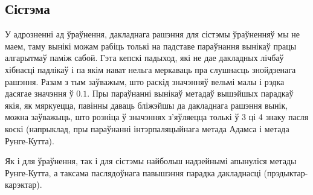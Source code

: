 \subsection*{Сістэма}
У адрозненні ад ўраўнення, дакладнага рашэння для сістэмы ўраўненняў мы не маем, таму вынікі можам рабіць толькі на падставе параўнання вынікаў працы алгарытмаў паміж сабой. Гэта кепскі падыход, які не дае дакладных лічбаў хібнасці падлікаў і па якім нават нельга меркаваць пра слушнасць знойдзенага рашэння. Разам з тым заўважым, што раскід значэнняў вельмі малы і рэдка дасягае значэння ў $0.1$. Пры параўнанні вынікаў метадаў вышэйшых парадкаў якія, як мяркуецца, павінны даваць бліжэйшы да дакладнага рашэння вынік, можна заўважыць, што розніца ў значэннях з'яўляецца толькі ў 3 ці 4 знаку пасля коскі (напрыклад, пры параўнанні інтэрпаляцыйнага метада Адамса і метада Рунге-Кутта).\par
\vspace{10mm}
Як і для ўраўнення, так і для сістэмы найбольш надзейнымі апынуліся метады Рунге-Кутта, а таксама паслядоўнага павышэння парадка дакладнасці (прэдыктар-карэктар).
